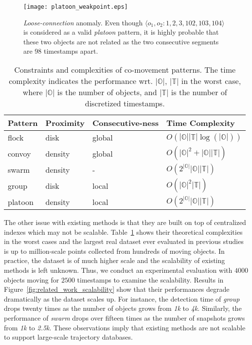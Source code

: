 \begin{figure}[h]
\center
\texttt{[image: platoon\_weakpoint.eps]}
\caption{\emph{Loose-connection} anomaly. Even though $\langle o_1, o_2: 1,2,3,102,103,104 \rangle$ is considered as a valid \emph{platoon} pattern, it is highly probable that these two objects are not related as the two consecutive segments  are 98 timestamps apart. 
}
\label{fig:platoon_weakpoint}
\end{figure}

\begin{table}[t]
\centering
\begin{tabular}{|p{1.5cm}|p{1.5cm}|p{2cm}|p{2.3cm}|}
\hline 
\textbf{Pattern} & {\textbf{Proximity}} & { \textbf{Consecutive-ness}} & { \textbf{Time  Complexity}}\\ 
\hline 
flock~\cite{gudmundsson2004flock} & disk &  global & {$O(|\mathbb{O}||\mathbb{T}|\log(|\mathbb{O}|))$} \\ 
\hline 
convoy~\cite{jeung2008convoy} & density &   global & {$O(|\mathbb{O}|^2+|\mathbb{O}||\mathbb{T}|)$}\\ 
\hline 
swarm~\cite{li2010swarm} & density  & - & {$O(2^{|\mathbb{O}|}|\mathbb{O}||\mathbb{T}|)$}  \\ 
\hline 
group~\cite{wang2006grouppattern} & disk &  local & {$O(|\mathbb{O}|^2|\mathbb{T}|)$}\\ 
\hline 
platoon~\cite{li2015platoon} & density &  local & {$O(2^{|\mathbb{O}|}|\mathbb{O}||\mathbb{T}|)$}\\ 
\hline 
\end{tabular} 
\caption{Constraints and complexities of co-movement patterns. The time complexity indicates the performance wrt.
$|\mathbb{O}|$, $|\mathbb{T}|$ in the worst case, where $|\mathbb{O}|$ is the number of objects, and $|\mathbb{T}|$ is the number of discretized timestamps.}
\label{tbl:existing_co_patterns}
\end{table}

The other issue with existing methods is that they are built on top of centralized indexes which may not be scalable. Table~\ref{tbl:existing_co_patterns} shows their theoretical complexities in the worst cases and the largest real dataset ever evaluated in previous studies is up to million-scale points collected from hundreds of moving objects. In practice, the dataset is of much higher scale and the scalability of existing methods is left unknown. Thus, we conduct an experimental evaluation with $4000$ objects moving for $2500$ timestamps to examine the scalability. Results in Figure~\ref{fig:related_work_scalability} show that their performances degrade dramatically as the dataset scales up. For instance, the detection time of \emph{group} drops twenty times as the number of objects grows from \emph{1k} to \emph{4k}. Similarly,
the performance of \emph{swarm} drops over fifteen times as the number of snapshots grows from \emph{1k} to \emph{2.5k}.
These observations imply that existing methods are not scalable to support large-scale trajectory databases. 


